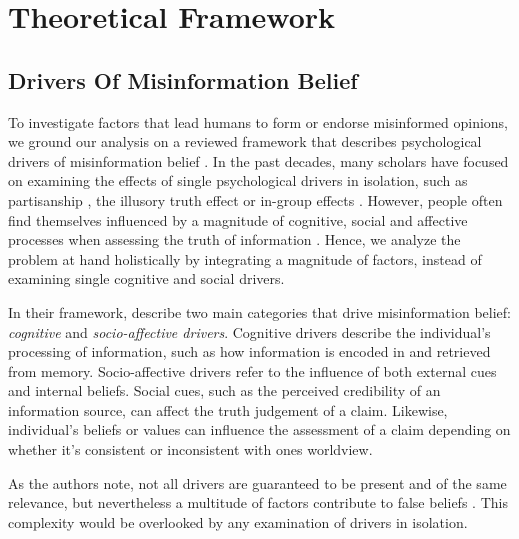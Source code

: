 \documentclass[
10pt, %
a4paper, %
oneside, %
headinclude,footinclude, %
] {book}%
\begin{document}




\newpage
\clearpage

\chapter{Theoretical Framework}
\label{chp:theoretical_framework}

\section{Drivers Of Misinformation Belief}
To investigate factors that lead humans to form or endorse misinformed opinions, we ground our analysis on a reviewed framework that describes psychological drivers of misinformation belief \citep{psychological_drivers_misinformation}. In the past decades, many scholars have focused on examining the effects of single psychological drivers in isolation, such as partisanship \citep{osmundsen2021partisan, baptista2021partisanship, grady2021nevertheless}, the illusory truth effect \citep{wang_illusory_truth, dechene2010truth} or in-group effects \citep{mackie1990processing, wyer2010selective}.  However, people often find themselves influenced by a magnitude of cognitive, social and affective processes when assessing the truth of information \citep{PENNYCOOK2021388}. Hence, we analyze the problem at hand holistically by integrating a magnitude of factors, instead of examining single cognitive and social drivers.

In their framework, \cite{psychological_drivers_misinformation} describe two main categories that drive misinformation belief: \emph{cognitive} and \emph{socio-affective drivers}. Cognitive drivers describe the individual's processing of information, such as how information is encoded in and retrieved from memory. Socio-affective drivers refer to the influence of both external cues and internal beliefs. Social cues, such as the perceived credibility of an information source, can affect the truth judgement of a claim. Likewise, individual's beliefs or values can influence the assessment of a claim depending on whether it's consistent or inconsistent with ones worldview.

As the authors note, not all drivers are guaranteed to be present and of the same relevance, but nevertheless a multitude of factors contribute to false beliefs \citep{psychological_drivers_misinformation}. This complexity would be overlooked by any examination of drivers in isolation.
\end{document}
